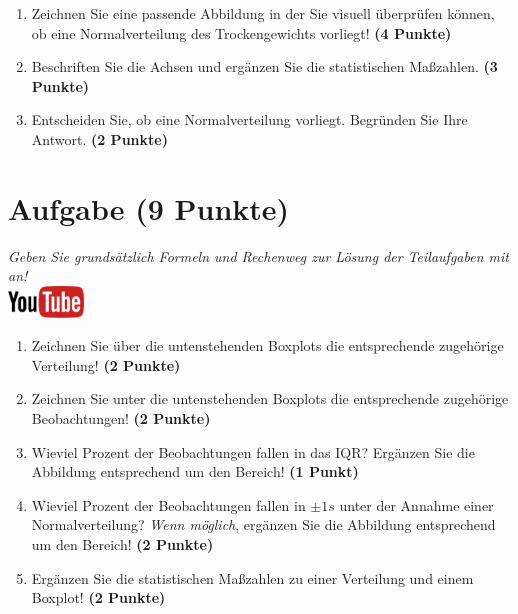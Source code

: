 \documentclass[a4paper, 10pt]{scrartcl}\usepackage[]{graphicx}\usepackage[]{xcolor}
\begin{document}
\begin{enumerate}
\item Zeichnen Sie eine passende Abbildung in der Sie visuell {\"u}berpr{\"u}fen
  k{\"o}nnen, ob eine Normalverteilung des Trockengewichts vorliegt! \textbf{(4
    Punkte)}
\item Beschriften Sie die Achsen und erg{\"a}nzen Sie die statistischen
  Ma{\ss}zahlen. \textbf{(3 Punkte)}
\item Entscheiden Sie, ob eine Normalverteilung vorliegt. Begr{\"u}nden Sie Ihre
  Antwort. \textbf{(2 Punkte)}
\end{enumerate} 
\clearpage

\section{Aufgabe \hfill (9 Punkte)}

\textit{Geben Sie grunds{\"a}tzlich Formeln und Rechenweg zur L{\"o}sung der
  Teilaufgaben mit an!} \\[1Ex]

\hfill\href{https://youtu.be/Op-gjzASH9I}{\includegraphics[width =
  2cm]{img/youtube}}\\[1Ex]



\begin{enumerate}
\item Zeichnen Sie {\"u}ber die untenstehenden Boxplots die entsprechende
  zugeh{\"o}rige Verteilung! \textbf{(2 Punkte)} 
\item Zeichnen Sie unter die untenstehenden Boxplots die entsprechende
  zugeh{\"o}rige Beobachtungen! \textbf{(2 Punkte)}
\item Wieviel Prozent der Beobachtungen fallen in das IQR? Erg{\"a}nzen Sie die
  Abbildung entsprechend um den Bereich! \textbf{(1 Punkt)}
\item Wieviel Prozent der Beobachtungen fallen in $\pm 1s$ unter
  der Annahme einer Normalverteilung?  \textit{Wenn m{\"o}glich}, erg{\"a}nzen Sie
  die Abbildung entsprechend um den Bereich! \textbf{(2 Punkte)}
\item Erg{\"a}nzen Sie die statistischen Ma{\ss}zahlen zu einer Verteilung und
  einem Boxplot! \textbf{(2 Punkte)}
\end{enumerate}
\end{document}
